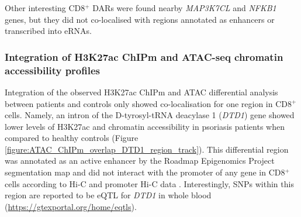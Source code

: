 Other interesting CD8$^+$ DARs were found nearby \textit{MAP3K7CL} and \textit{NFKB1} genes, but they did not co-localised with regions annotated as enhancers or transcribed into eRNAs.


\subsubsection{Integration of H3K27ac ChIPm and ATAC-seq chromatin accessibility profiles}

Integration of the observed H3K27ac ChIPm and ATAC differential analysis between patients and controls only showed co-localisation for one region in CD8$^+$ cells. Namely, an intron of the D-tyrosyl-tRNA deacylase 1 (\textit{DTD1}) gene showed lower levels of H3K27ac and chromatin accessibility in psoriasis patients when compared to healthy controls (Figure \ref{figure:ATAC_ChIPm_overlap_DTD1_region_track}). This differential region was annotated as an active enhancer by the Roadmap Epigenomics Project segmentation map and did not interact with the promoter of any gene in CD8$^+$ cells according to Hi-C and promoter Hi-C  data \parencite{Javierre2016}. Interestingly, SNPs within this region are reported to be eQTL for \textit{DTD1} in whole blood (\url{https://gtexportal.org/home/eqtls}). 

